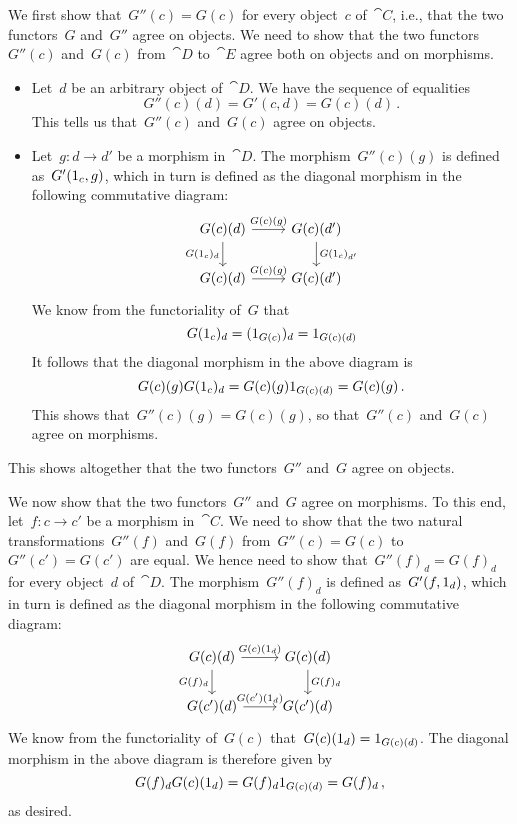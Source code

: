 We first show that~$G''(c) = G(c)$ for every object~$c$ of~$\cat{C}$, i.e., that the two functors~$G$ and~$G''$ agree on objects.
We need to show that the two functors~$G''(c)$ and~$G(c)$ from~$\cat{D}$ to~$\cat{E}$ agree both on objects and on morphisms.
\begin{itemize}

	\item
		Let~$d$ be an arbitrary object of~$\cat{D}$.
		We have the sequence of equalities
		\[
			G''(c)(d) = G'(c, d) = G(c)(d) \,.
		\]
		This tells us that~$G''(c)$ and~$G(c)$ agree on objects.

	\item
		Let~$g \colon d \to d'$ be a morphism in~$\cat{D}$.
		The morphism~$G''(c)(g)$ is defined as~$G'(1_c, g)$, which in turn is defined as the diagonal morphism in the following commutative diagram:
		\[
			\begin{tikzcd}
				G(c)(d)
				\arrow{r}[above]{G(c)(g)}
				\arrow{d}[left]{G(\id_c)_d}
				&
				G(c)(d')
				\arrow{d}[right]{G(\id_c)_{d'}}
				\\
				G(c)(d)
				\arrow{r}[above]{G(c)(g)}
				&
				G(c)(d')
			\end{tikzcd}
		\]
		We know from the functoriality of~$G$ that
		\[
			G(1_c)_d
			=
			(1_{G(c)})_d
			=
			1_{G(c)(d)}
		\]
		It follows that the diagonal morphism in the above diagram is
		\[
			G(c)(g) G(1_c)_d
			=
			G(c)(g) 1_{G(c)(d)}
			=
			G(c)(g) \,.
		\]
		This shows that~$G''(c)(g) = G(c)(g)$, so that~$G''(c)$ and~$G(c)$ agree on morphisms.

\end{itemize}
This shows altogether that the two functors~$G''$ and~$G$ agree on objects.

We now show that the two functors~$G''$ and~$G$ agree on morphisms.
To this end, let~$f \colon c \to c'$ be a morphism in~$\cat{C}$.
We need to show that the two natural transformations~$G''(f)$ and~$G(f)$ from~$G''(c) = G(c)$ to~$G''(c') = G(c')$ are equal.
We hence need to show that~$G''(f)_d = G(f)_d$ for every object~$d$ of~$\cat{D}$.
The morphism~$G''(f)_d$ is defined as~$G'(f, 1_d)$, which in turn is defined as the diagonal morphism in the following commutative diagram:
\[
	\begin{tikzcd}
		G(c)(d)
		\arrow{r}[above]{G(c)(\id_d)}
		\arrow{d}[left]{G(f)_d}
		&
		G(c)(d)
		\arrow{d}[right]{G(f)_d}
		\\
		G(c')(d)
		\arrow{r}[above]{G(c')(\id_d)}
		&
		G(c')(d)
	\end{tikzcd}
\]
We know from the functoriality of~$G(c)$ that~$G(c)(1_d) = 1_{G(c)(d)}$.
The diagonal morphism in the above diagram is therefore given by
\[
	G(f)_d G(c)(1_d)
	=
	G(f)_d 1_{G(c)(d)}
	=
	G(f)_d \,,
\]
as desired.
